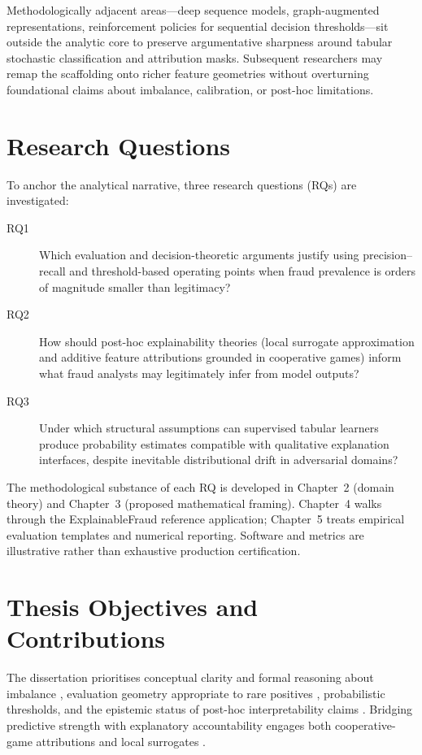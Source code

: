 Methodologically adjacent areas—deep sequence models, graph-augmented representations, reinforcement policies for sequential decision thresholds—sit outside the analytic core to preserve argumentative sharpness around tabular stochastic classification and attribution masks. Subsequent researchers may remap the scaffolding onto richer feature geometries without overturning foundational claims about imbalance, calibration, or post-hoc limitations.

\section{Research Questions}
To anchor the analytical narrative, three research questions (RQs) are investigated:
\begin{description}
    \item[RQ1] Which evaluation and decision-theoretic arguments justify using precision--recall and threshold-based operating points when fraud prevalence is orders of magnitude smaller than legitimacy?
    \item[RQ2] How should post-hoc explainability theories (local surrogate approximation and additive feature attributions grounded in cooperative games) inform what fraud analysts may legitimately infer from model outputs?
    \item[RQ3] Under which structural assumptions can supervised tabular learners produce probability estimates compatible with qualitative explanation interfaces, despite inevitable distributional drift in adversarial domains?
\end{description}
The methodological substance of each RQ is developed in Chapter~2 (domain theory) and Chapter~3 (proposed mathematical framing). Chapter~4 walks through the ExplainableFraud reference application; Chapter~5 treats empirical evaluation templates and numerical reporting. Software and metrics are illustrative rather than exhaustive production certification.

\section{Thesis Objectives and Contributions}
The dissertation prioritises conceptual clarity and formal reasoning about imbalance \cite{he_garcia_imbalanced2009,fraud_handbook}, evaluation geometry appropriate to rare positives \cite{davis_goadrich_icml06}, probabilistic thresholds, and the epistemic status of post-hoc interpretability claims \cite{guidotti_blackbox_survey2018,gdpr_text}. Bridging predictive strength with explanatory accountability engages both cooperative-game attributions and local surrogates \cite{lime_original,shap_original,xai_survey}.

